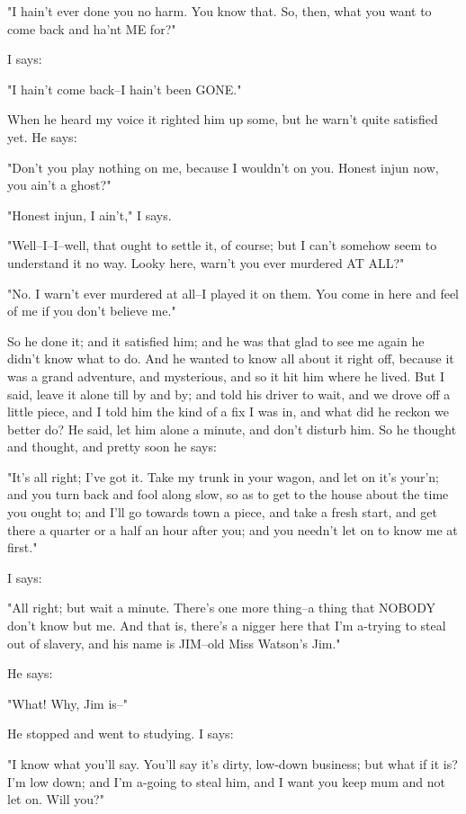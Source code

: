 "I hain't ever done you no harm.  You know that.  So, then, what you want
to come back and ha'nt ME for?"

I says:

"I hain't come back--I hain't been GONE."

When he heard my voice it righted him up some, but he warn't quite
satisfied yet.  He says:

"Don't you play nothing on me, because I wouldn't on you.  Honest injun
now, you ain't a ghost?"

"Honest injun, I ain't," I says.

"Well--I--I--well, that ought to settle it, of course; but I can't
somehow seem to understand it no way.  Looky here, warn't you ever
murdered AT ALL?"

"No.  I warn't ever murdered at all--I played it on them.  You come in
here and feel of me if you don't believe me."

So he done it; and it satisfied him; and he was that glad to see me again
he didn't know what to do.  And he wanted to know all about it right off,
because it was a grand adventure, and mysterious, and so it hit him where
he lived.  But I said, leave it alone till by and by; and told his driver
to wait, and we drove off a little piece, and I told him the kind of a
fix I was in, and what did he reckon we better do?  He said, let him
alone a minute, and don't disturb him.  So he thought and thought, and
pretty soon he says:

"It's all right; I've got it.  Take my trunk in your wagon, and let on
it's your'n; and you turn back and fool along slow, so as to get to the
house about the time you ought to; and I'll go towards town a piece, and
take a fresh start, and get there a quarter or a half an hour after you;
and you needn't let on to know me at first."

I says:

"All right; but wait a minute.  There's one more thing--a thing that
NOBODY don't know but me.  And that is, there's a nigger here that I'm
a-trying to steal out of slavery, and his name is JIM--old Miss Watson's
Jim."

He says:

"What!  Why, Jim is--"

He stopped and went to studying.  I says:

"I know what you'll say.  You'll say it's dirty, low-down business; but
what if it is?  I'm low down; and I'm a-going to steal him, and I want
you keep mum and not let on.  Will you?"

